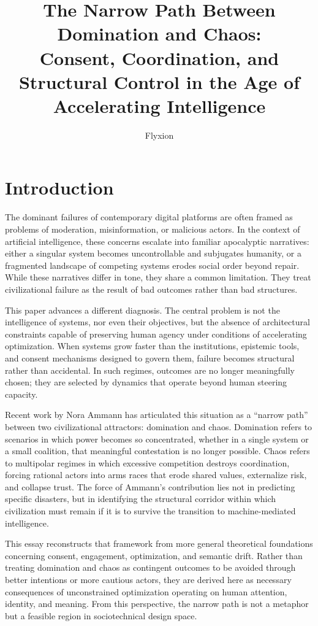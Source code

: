 \documentclass[11pt,oneside]{article}
\title{The Narrow Path Between Domination and Chaos:\\
Consent, Coordination, and Structural Control in the Age of Accelerating Intelligence}
\author{Flyxion}
\date{}
\begin{document}
\maketitle

\section{Introduction}

The dominant failures of contemporary digital platforms are often framed as problems of moderation, misinformation, or malicious actors. In the context of artificial intelligence, these concerns escalate into familiar apocalyptic narratives: either a singular system becomes uncontrollable and subjugates humanity, or a fragmented landscape of competing systems erodes social order beyond repair. While these narratives differ in tone, they share a common limitation. They treat civilizational failure as the result of bad outcomes rather than bad structures.

This paper advances a different diagnosis. The central problem is not the intelligence of systems, nor even their objectives, but the absence of architectural constraints capable of preserving human agency under conditions of accelerating optimization. When systems grow faster than the institutions, epistemic tools, and consent mechanisms designed to govern them, failure becomes structural rather than accidental. In such regimes, outcomes are no longer meaningfully chosen; they are selected by dynamics that operate beyond human steering capacity.

Recent work by Nora Ammann has articulated this situation as a “narrow path” between two civilizational attractors: domination and chaos. Domination refers to scenarios in which power becomes so concentrated, whether in a single system or a small coalition, that meaningful contestation is no longer possible. Chaos refers to multipolar regimes in which excessive competition destroys coordination, forcing rational actors into arms races that erode shared values, externalize risk, and collapse trust. The force of Ammann’s contribution lies not in predicting specific disasters, but in identifying the structural corridor within which civilization must remain if it is to survive the transition to machine-mediated intelligence.

This essay reconstructs that framework from more general theoretical foundations concerning consent, engagement, optimization, and semantic drift. Rather than treating domination and chaos as contingent outcomes to be avoided through better intentions or more cautious actors, they are derived here as necessary consequences of unconstrained optimization operating on human attention, identity, and meaning. From this perspective, the narrow path is not a metaphor but a feasible region in sociotechnical design space.
\end{document}

